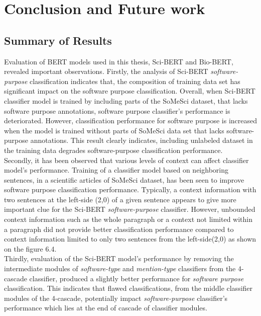 \chapter{Conclusion and Future work}
\label{ch:chapter07}
 
%
%

\section{Summary of Results }
\label{sec:chapter06:summary}

Evaluation of \ac{BERT} models used in this thesis, \ac{Sci-BERT} and \ac{Bio-BERT}, revealed important observations. Firstly, the analysis of Sci-BERT \emph{software-purpose} classification indicates that, the composition of training data set has significant impact on the software purpose classification. Overall, when Sci-BERT classifier model is trained by including parts of the SoMeSci dataset, that lacks software purpose annotations, software purpose classifier's performance is deteriorated. However, classification performance for software purpose is increased when the model is trained without parts of SoMeSci data set that lacks software-purpose annotations. This result clearly indicates, including unlabeled dataset in the training data degrades software-purpose classification performance.  \\

Secondly, it has been observed that various levels of context can affect classifier model's performance. Training of a classifier model based on neighboring sentences, in a scientific articles of SoMeSci dataset, has been seen to improve software purpose classification performance. Typically, a context information with two sentences at the left-side (2,0) of a given sentence appears to give more important clue for the \ac{Sci-BERT} \emph{software-purpose} classifier. However, unbounded context information such as the whole paragraph or a context not limited within a paragraph did not provide better classification performance compared to context information limited to only two sentences from the left-side(2,0) as shown on the figure 6.4. \\


Thirdly, evaluation of the Sci-BERT model's performance by removing the intermediate modules of \emph{software-type} and \emph{mention-type} classifiers from the 4-cascade classifier, produced a slightly better performance for \emph{software purpose} classification.  This indicates that flawed classifications, from the middle classifier modules of the 4-cascade, potentially impact \emph{software-purpose} classifier's performance which lies at the end of cascade of classifier modules. \\

